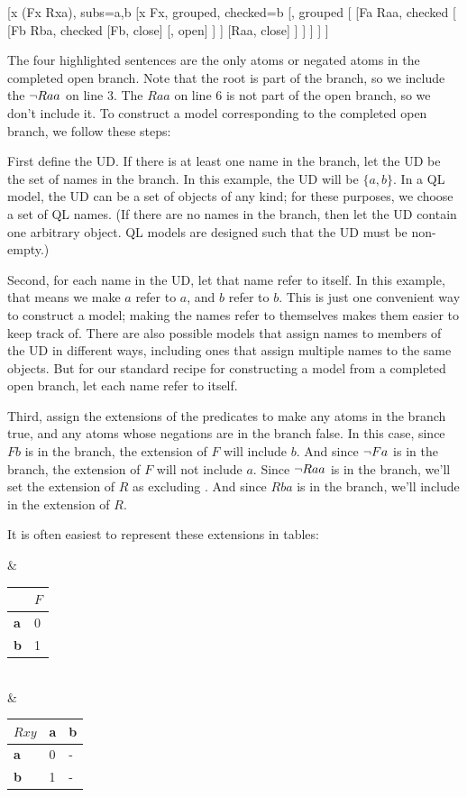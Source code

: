 \begin{highlightprooftree}
{
}
[\forall x (Fx \eif Rxa), subs={a,b}
[\exists x Fx, grouped, checked={b}
[, grouped
	[
		[Fa \eif Raa, checked
			[
				[Fb \eif Rba, checked
					[\enot Fb, close]
					[, open]
				]
			]
			[Raa, close]
		]
	]
]
]
]
\end{highlightprooftree}

The four highlighted sentences are the only atoms or negated atoms in the completed open branch. Note that the root is part of the branch, so we include the $\neg Raa$ on line 3. The $Raa$ on line 6 is not part of the open branch, so we don't include it. To construct a model corresponding to the completed open branch, we follow these steps:

First define the UD. If there is at least one name in the branch, let the UD be the set of names in the branch. In this example, the UD will be $\{a, b\}$. In a QL model, the UD can be a set of objects of any kind; for these purposes, we choose a set of QL names. (If there are no names in the branch, then let the UD contain one arbitrary object. QL models are designed such that the UD must be non-empty.)

Second, for each name in the UD, let that name refer to itself. In this example, that means we make $a$ refer to $a$, and $b$ refer to $b$. This is just one convenient way to construct a model; making the names refer to themselves makes them easier to keep track of. There are also possible models that assign names to members of the UD in different ways, including ones that assign multiple names to the same objects. But for our standard recipe for constructing a model from a completed open branch, let each name refer to itself.

Third, assign the extensions of the predicates to make any atoms in the branch true, and any atoms whose negations are in the branch false. In this case, since $Fb$ is in the branch, the extension of $F$ will include $b$. And since $\neg Fa$ is in the branch, the extension of $F$ will not include $a$. Since $\neg Raa$ is in the branch, we'll set the extension of $R$ as excluding . And since $Rba$ is in the branch, we'll include  in the extension of $R$.

It is often easiest to represent these extensions in tables:

\begin{partialmodel}
	 & \begin{tabular}{l|l}
	           & $F$ \\ \hline
		\textbf{a} & 0          \\
		\textbf{b} & 1         
		\end{tabular}\\
	 & \begin{tabular}{l|ll} $Rxy$ & \textbf{a} & \textbf{b} \\ \hline
		\textbf{a} & 0 & - \\
		\textbf{b} & 1 & -
		\end{tabular}\\
\end{partialmodel}

